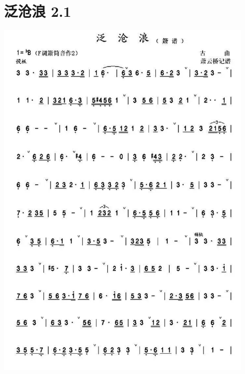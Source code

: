 \documentclass[cn,pad,twocol]{elegantbook}
\begin{document}
\section{泛沧浪 2.1}\includegraphics[width=0.95\textwidth]{dongxiao/20200819/泛沧浪-1.jpeg}
\end{document}
